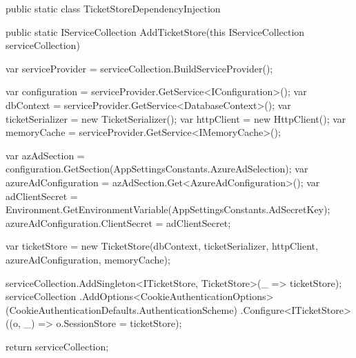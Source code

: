 \begin{spverbatim}
    public static class TicketStoreDependencyInjection
        {
        public static IServiceCollection AddTicketStore(this IServiceCollection serviceCollection)
            {
            var serviceProvider = serviceCollection.BuildServiceProvider();

            var configuration = serviceProvider.GetService<IConfiguration>();
            var dbContext = serviceProvider.GetService<DatabaseContext>();
            var ticketSerializer = new TicketSerializer();
            var httpClient = new HttpClient();
            var memoryCache = serviceProvider.GetService<IMemoryCache>();

            var azAdSection = configuration.GetSection(AppSettingsConstants.AzureAdSelection);
            var azureAdConfiguration = azAdSection.Get<AzureAdConfiguration>();
            var adClientSecret = Environment.GetEnvironmentVariable(AppSettingsConstants.AdSecretKey);
            azureAdConfiguration.ClientSecret = adClientSecret;

            var ticketStore = new TicketStore(dbContext, ticketSerializer, httpClient, azureAdConfiguration, memoryCache);

            serviceCollection.AddSingleton<ITicketStore, TicketStore>(_ => ticketStore);
            serviceCollection
            .AddOptions<CookieAuthenticationOptions>(CookieAuthenticationDefaults.AuthenticationScheme)
            .Configure<ITicketStore>((o, _) => o.SessionStore = ticketStore);

            return serviceCollection;
        }
    }
\end{spverbatim}